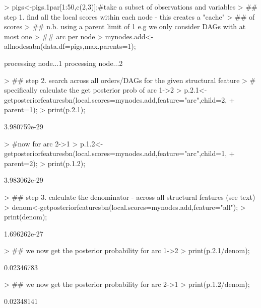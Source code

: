 \documentclass[nojss]{jss}
\begin{document}
\begin{Schunk}
\begin{Sinput}
> pigs<-pigs.1par[1:50,c(2,3)];#take a subset of observations and variables
> ## step 1. find all the local scores within each node - this creates a "cache"
> ## of scores
> ## n.b. using a parent limit of 1 e.g we only consider DAGs with at most one 
> ## arc per node
> mynodes.add<-allnodesabn(data.df=pigs,max.parents=1); 
\end{Sinput}
\begin{Soutput}
processing node...1
processing node...2
\end{Soutput}
\begin{Sinput}
> ## step 2. search across all orders/DAGs for the given structural feature
> # specifically calculate the get posterior prob of arc 1->2 
> p.2.1<-getposteriorfeaturesbn(local.scores=mynodes.add,feature="arc",child=2,
+                               parent=1);
> print(p.2.1);
\end{Sinput}
\begin{Soutput}
[1] 3.980759e-29
\end{Soutput}
\begin{Sinput}
> #now for arc 2->1
> p.1.2<-getposteriorfeaturesbn(local.scores=mynodes.add,feature="arc",child=1,
+                               parent=2);
> print(p.1.2);
\end{Sinput}
\begin{Soutput}
[1] 3.983062e-29
\end{Soutput}
\begin{Sinput}
> ## step 3. calculate the denominator - across all structural features (see text)
> denom<-getposteriorfeaturesbn(local.scores=mynodes.add,feature="all");
> print(denom);
\end{Sinput}
\begin{Soutput}
[1] 1.696262e-27
\end{Soutput}
\begin{Sinput}
> ## we now get the posterior probability for arc 1->2
> print(p.2.1/denom);
\end{Sinput}
\begin{Soutput}
[1] 0.02346783
\end{Soutput}
\begin{Sinput}
> ## we now get the posterior probability for arc 2->1
> print(p.1.2/denom);
\end{Sinput}
\begin{Soutput}
[1] 0.02348141
\end{Soutput}
\end{Schunk}
\end{document}

